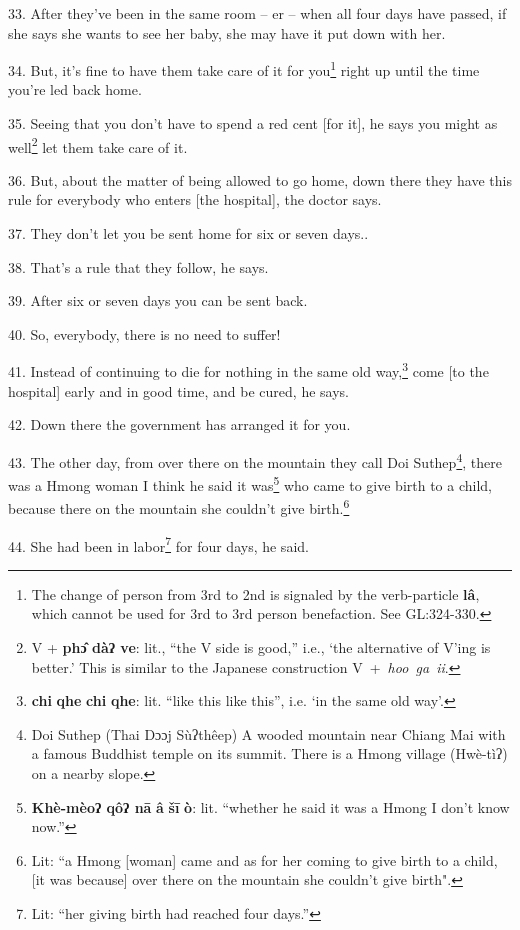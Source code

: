 33. After they've been in the same room -- er -- when all four days have passed,
if she says she wants to see her baby, she may have it put down with her.

34. But, it's fine to have them take care of it for you\footnote{The change of person from 3rd to 2nd is signaled by the verb-particle \textbf{lâ}, which cannot be used for 3rd to 3rd person benefaction. See GL:324-330.} right up until the
time you're led back home.

35. Seeing that you don't have to spend a red cent [for it], he says you might
as well\footnote{V + \textbf{phɔ̂ dàʔ ve}: lit., ``the V side is good,'' i.e., `the alternative of V'ing is better.' This is similar to the Japanese construction V~+~\textit{hoo~ga~ii}.} let them take care of it.

36. But, about the matter of being allowed to go home, down there they have this
rule for everybody who enters [the hospital], the doctor says.

37. They don't let you be sent home for six or seven days..

38. That's a rule that they follow, he says.

39. After six or seven days you can be sent back.

40. So, everybody, there is no need to suffer!

41. Instead of continuing to die for nothing in the same old way,\footnote{\textbf{chi} \textbf{qhe} \textbf{chi} \textbf{qhe}: lit. ``like this like this'', i.e. `in the same old way'.} come [to
the hospital] early and in good time, and be cured, he says.

42. Down there the government has arranged it for you.

43. The other day, from over there on the mountain they call Doi Suthep\footnote{Doi Suthep (Thai Dɔɔj Sùʔthêep) A wooded mountain near Chiang Mai with a famous Buddhist temple on its summit. There is a Hmong village (Hwè-tìʔ) on a nearby slope.}, there
was a Hmong woman I think he said it was\footnote{\textbf{Khè-mèoʔ qôʔ nā} \textbf{â} \textbf{šī} \textbf{ò}: lit. ``whether he said it was a Hmong I don't know now.''} who came to give birth to a child,
because there on the mountain she couldn't give birth.\footnote{Lit: ``a Hmong [woman] came and as for her coming to give birth to a child, [it was because] over there on the mountain she couldn't give birth".}

44. She had been in labor\footnote{Lit: ``her giving birth had reached four days.''} for four days, he said.


